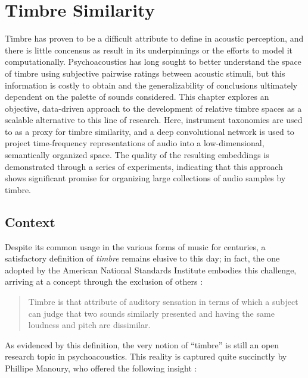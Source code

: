 
\graphicspath{{4/figures/}}

\chapter{Timbre Similarity}
\label{chp:timbre}

Timbre has proven to be a difficult attribute to define in acoustic perception, and there is little concensus as result in its underpinnings or the efforts to model it computationally.
Psychoacoustics has long sought to better understand the space of timbre using subjective pairwise ratings between acoustic stimuli, but this information is costly to obtain and the generalizability of conclusions ultimately dependent on the palette of sounds considered.
This chapter explores an objective, data-driven approach to the development of relative timbre spaces as a scalable alternative to this line of research.
Here, instrument taxonomies are used to as a proxy for timbre similarity, and a deep convolutional network is used to project time-frequency representations of audio into a low-dimensional, semantically organized space.
The quality of the resulting embeddings is demonstrated through a series of experiments, indicating that this approach shows significant promise for organizing large collections of audio samples by timbre.


\section{Context}
\label{sec:context}

Despite its common usage in the various forms of music for centuries, a satisfactory definition of \emph{timbre} remains elusive to this day; in fact, the one adopted by the American National Standards Institute embodies this challenge, arriving at a concept through the exclusion of others \cite{ANSI197x}:

\begin{quote}
Timbre is that attribute of auditory sensation in terms of which a subject can judge that two sounds similarly presented and having the same loudness and pitch are dissimilar.
\end{quote}

As evidenced by this definition, the very notion of ``timbre'' is still an open research topic in psychoacoustics.
This reality is captured quite succinctly by Phillipe Manoury, who offered the following insight \cite{}:

